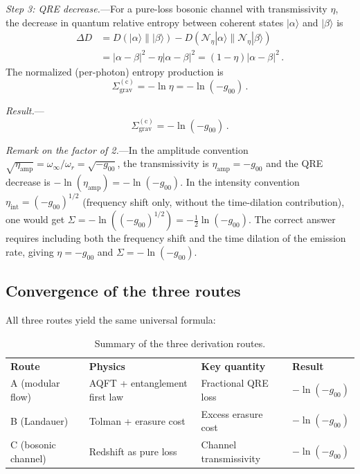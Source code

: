 \documentclass[aps,prd,preprint,superscriptaddress,longbibliography]{revtex4-2}
\newcommand{\chan}{\mathcal{N}}
\newcommand{\ket}[1]{|#1\rangle}
\newcommand{\Sgrav}{\Sigma_{\mathrm{grav}}}
\begin{document}
\emph{Step 3: QRE decrease.}---For a pure-loss bosonic channel with
transmissivity $\eta$, the decrease in quantum relative entropy between
coherent states $\ket{\alpha}$ and $\ket{\beta}$ is~\cite{Weedbrook2012}
\begin{align}
  \Delta D &= D(\ket{\alpha}\|\ket{\beta})
  - D(\chan_\eta\ket{\alpha}\|\chan_\eta\ket{\beta})
  \nonumber\\
  &= |\alpha-\beta|^2 - \eta|\alpha-\beta|^2
  = (1-\eta)|\alpha-\beta|^2\,.
  \label{eq:DeltaD_loss}
\end{align}
The normalized (per-photon) entropy production is
\begin{equation}
  \Sgrav^{(\mathrm{c})} = -\ln\eta = -\ln(-g_{00})\,.
  \label{eq:Sigma_c}
\end{equation}

\emph{Result.}---
\begin{equation}
  \boxed{\Sgrav^{(\mathrm{c})} = -\ln(-g_{00})\,.}
  \label{eq:route_c_result}
\end{equation}

\emph{Remark on the factor of 2.}---In the amplitude convention
$\sqrt{\eta_{\mathrm{amp}}} = \omega_\infty/\omega_r = \sqrt{-g_{00}}$,
the transmissivity is $\eta_{\mathrm{amp}} = -g_{00}$ and the QRE
decrease is $-\ln(\eta_{\mathrm{amp}}) = -\ln(-g_{00})$.  In the
intensity convention
$\eta_{\mathrm{int}} = (-g_{00})^{1/2}$ (frequency shift only,
without the time-dilation contribution), one would get
$\Sigma = -\ln((-g_{00})^{1/2}) = -\frac{1}{2}\ln(-g_{00})$.  The
correct answer requires including both the frequency shift and
the time dilation of the emission rate, giving $\eta = -g_{00}$ and
$\Sigma = -\ln(-g_{00})$.

\subsection{Convergence of the three routes}
\label{sec:convergence}

All three routes yield the same universal formula:

\begin{table}[h]
\caption{\label{tab:routes}Summary of the three derivation routes.}
\begin{ruledtabular}
\begin{tabular}{llll}
  \textbf{Route} & \textbf{Physics} & \textbf{Key quantity}
    & \textbf{Result} \\
  \colrule
  A (modular flow) & AQFT + entanglement first law
    & Fractional QRE loss & $-\ln(-g_{00})$ \\
  B (Landauer) & Tolman + erasure cost
    & Excess erasure cost & $-\ln(-g_{00})$ \\
  C (bosonic channel) & Redshift as pure loss
    & Channel transmissivity & $-\ln(-g_{00})$ \\
\end{tabular}
\end{ruledtabular}
\end{table}
\end{document}
